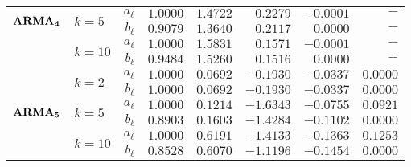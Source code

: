 \documentclass[a4paper, 12pt]{article}
\begin{document}
\begin{table}[ht]
\begin{tabular}{clrrrrrr}
		\multirow{2}{*}{\(\boldsymbol{\text{\textbf{ARMA}}_4}\)} & \multirow{2}{*}{\(k = 5\)}  & \(a_\ell\) & \(1.0000\)              & \(1.4722\)              & \(0.2279\)              & \(-0.0001\)             & \( - \)                 \\
		                                                         &                             & \(b_\ell\) & \(0.9079\)              & \(1.3640\)              & \(0.2117\)              & \(0.0000\)              & \( - \)                 \\ \cmidrule(l){2-8}
		                                                         & \multirow{2}{*}{\(k = 10\)} & \(a_\ell\) & \(1.0000\)              & \(1.5831\)              & \(0.1571\)              & \(-0.0001\)             & \( - \)                 \\
		                                                         &                             & \(b_\ell\) & \(0.9484\)              & \(1.5260\)              & \(0.1516\)              & \(0.0000\)              & \( - \)                 \\ \midrule
		                                                         & \multirow{2}{*}{\(k = 2\)}  & \(a_\ell\) & \(1.0000\)              & \(0.0692\)              & \(-0.1930\)             & \(-0.0337\)             & \(0.0000\)              \\
		                                                         &                             & \(b_\ell\) & \(1.0000\)              & \(0.0692\)              & \(-0.1930\)             & \(-0.0337\)             & \(0.0000\)              \\  \cmidrule(l){2-8}
		\multirow{2}{*}{\(\boldsymbol{\text{\textbf{ARMA}}_5}\)} & \multirow{2}{*}{\(k = 5\)}  & \(a_\ell\) & \(1.0000\)              & \(0.1214\)              & \(-1.6343\)             & \(-0.0755\)             & \(0.0921\)              \\
		                                                         &                             & \(b_\ell\) & \(0.8903\)              & \(0.1603\)              & \(-1.4284\)             & \(-0.1102\)             & \(0.0000\)              \\  \cmidrule(l){2-8}
		                                                         & \multirow{2}{*}{\(k = 10\)} & \(a_\ell\) & \(1.0000\)              & \(0.6191\)              & \(-1.4133\)             & \(-0.1363\)             & \(0.1253\)              \\
		                                                         &                             & \(b_\ell\) & \(0.8528\)              & \(0.6070\)              & \(-1.1196\)             & \(-0.1454\)             & \(0.0000\)              \\
		\bottomrule
	\end{tabular}
\end{table}
\end{document}
